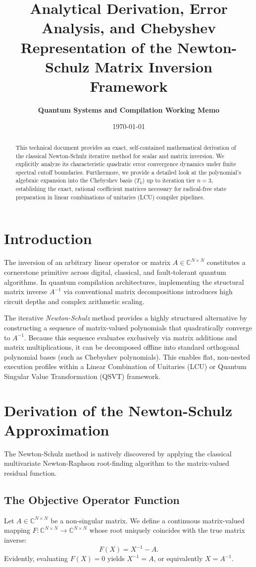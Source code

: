 \documentclass[11pt,a4paper]{article}
\title{\textbf{\Large Analytical Derivation, Error Analysis, and Chebyshev Representation of the Newton-Schulz Matrix Inversion Framework}}
\author{\textbf{Quantum Systems and Compilation Working Memo}}
\date{\today}
\begin{document}
\maketitle

\begin{abstract}
This technical document provides an exact, self-contained mathematical derivation of the classical Newton-Schulz iterative method for scalar and matrix inversion. We explicitly analyze its characteristic quadratic error convergence dynamics under finite spectral cutoff boundaries. Furthermore, we provide a detailed look at the polynomial's algebraic expansion into the Chebyshev basis ($T_k$) up to iteration tier $n=3$, establishing the exact, rational coefficient matrices necessary for radical-free state preparation in linear combinations of unitaries (LCU) compiler pipelines.
\end{abstract}

\section{Introduction}
The inversion of an arbitrary linear operator or matrix $A \in \mathbb{C}^{N \times N}$ constitutes a cornerstone primitive across digital, classical, and fault-tolerant quantum algorithms. In quantum compilation architectures, implementing the structural matrix inverse $A^{-1}$ via conventional matrix decompositions introduces high circuit depths and complex arithmetic scaling. 

The iterative \textit{Newton-Schulz} method provides a highly structured alternative by constructing a sequence of matrix-valued polynomials that quadratically converge to $A^{-1}$. Because this sequence evaluates exclusively via matrix additions and matrix multiplications, it can be decomposed offline into standard orthogonal polynomial bases (such as Chebyshev polynomials). This enables flat, non-nested execution profiles within a Linear Combination of Unitaries (LCU) or Quantum Singular Value Transformation (QSVT) framework.

\section{Derivation of the Newton-Schulz Approximation}
The Newton-Schulz method is natively discovered by applying the classical multivariate Newton-Raphson root-finding algorithm to the matrix-valued residual function.

\subsection{The Objective Operator Function}
Let $A \in \mathbb{C}^{N \times N}$ be a non-singular matrix. We define a continuous matrix-valued mapping $F: \mathbb{C}^{N \times N} \to \mathbb{C}^{N \times N}$ whose root uniquely coincides with the true matrix inverse:
\begin{equation}
F(X) = X^{-1} - A.
\end{equation}
Evidently, evaluating $F(X) = 0$ yields $X^{-1} = A$, or equivalently $X = A^{-1}$.
\end{document}
